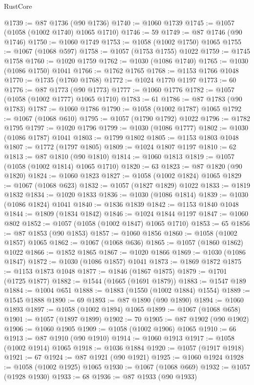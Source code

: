 \begin{lexlean}{RustCore}
\begin{coremodule}
@1739 := @87 @1736 (@90 @1736)
@1740 := @1060 @1739
@1745 := @1057 (@1058 (@1002 @1740) @1065 @1710)
@1746 := 59
@1749 := @87 @1746 (@90 @1746)
@1750 := @1060 @1749
@1753 := @1058 (@1002 @1750) @1065
@1755 := @1067 (@1068 @597)
@1758 := @1057 (@1753 @1755) @1022
@1759 := @1745 @1758
@1760 := @1020 @1759
@1762 := @1030 (@1086 @1740)
@1765 := @1030 (@1086 @1750) @1041
@1766 := @1762 @1765
@1768 := @1153 @1766 @1048
@1770 := @1735 (@1760 @1768)
@1772 := @1024 @1770 @1197
@1773 := 60
@1776 := @87 @1773 (@90 @1773)
@1777 := @1060 @1776
@1782 := @1057 (@1058 (@1002 @1777) @1065 @1710)
@1783 := 61
@1786 := @87 @1783 (@90 @1783)
@1787 := @1060 @1786
@1790 := @1058 (@1002 @1787) @1065
@1792 := @1067 (@1068 @610)
@1795 := @1057 (@1790 @1792) @1022
@1796 := @1782 @1795
@1797 := @1020 @1796
@1799 := @1030 (@1086 @1777)
@1802 := @1030 (@1086 @1787) @1041
@1803 := @1799 @1802
@1805 := @1153 @1803 @1048
@1807 := @1772 (@1797 @1805)
@1809 := @1024 @1807 @1197
@1810 := 62
@1813 := @87 @1810 (@90 @1810)
@1814 := @1060 @1813
@1819 := @1057 (@1058 (@1002 @1814) @1065 @1710)
@1820 := 63
@1823 := @87 @1820 (@90 @1820)
@1824 := @1060 @1823
@1827 := @1058 (@1002 @1824) @1065
@1829 := @1067 (@1068 @623)
@1832 := @1057 (@1827 @1829) @1022
@1833 := @1819 @1832
@1834 := @1020 @1833
@1836 := @1030 (@1086 @1814)
@1839 := @1030 (@1086 @1824) @1041
@1840 := @1836 @1839
@1842 := @1153 @1840 @1048
@1844 := @1809 (@1834 @1842)
@1846 := @1024 @1844 @1197
@1847 := @1060 @802
@1852 := @1057 (@1058 (@1002 @1847) @1065 @1710)
@1853 := 65
@1856 := @87 @1853 (@90 @1853)
@1857 := @1060 @1856
@1860 := @1058 (@1002 @1857) @1065
@1862 := @1067 (@1068 @636)
@1865 := @1057 (@1860 @1862) @1022
@1866 := @1852 @1865
@1867 := @1020 @1866
@1869 := @1030 (@1086 @1847)
@1872 := @1030 (@1086 @1857) @1041
@1873 := @1869 @1872
@1875 := @1153 @1873 @1048
@1877 := @1846 (@1867 @1875)
@1879 := @1701 (@1725 @1877)
@1882 := @1544 (@1665 (@1691 @1879))
@1883 := @1547 @189
@1884 := @1004 @651
@1888 := @1883 (@1550 (@1002 @1884) @1554)
@1889 := @1545 @1888
@1890 := 69
@1893 := @87 @1890 (@90 @1890)
@1894 := @1060 @1893
@1897 := @1058 (@1002 @1894) @1065
@1899 := @1067 (@1068 @658)
@1901 := @1057 (@1897 @1899)
@1902 := 70
@1905 := @87 @1902 (@90 @1902)
@1906 := @1060 @1905
@1909 := @1058 (@1002 @1906) @1065
@1910 := 66
@1913 := @87 @1910 (@90 @1910)
@1914 := @1060 @1913
@1917 := @1058 (@1002 @1914) @1065
@1918 := @1036 @1884
@1920 := @1057 (@1917 @1918)
@1921 := 67
@1924 := @87 @1921 (@90 @1921)
@1925 := @1060 @1924
@1928 := @1058 (@1002 @1925) @1065
@1930 := @1067 (@1068 @669)
@1932 := @1057 (@1928 @1930)
@1933 := 68
@1936 := @87 @1933 (@90 @1933)

\end{coremodule}
\end{lexlean}
